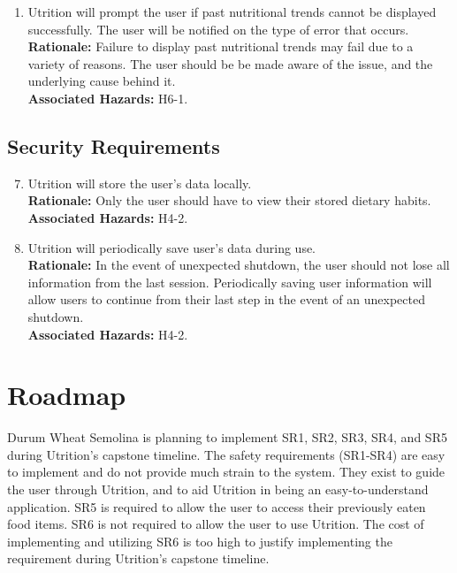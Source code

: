 \documentclass{article}
\begin{document}
\begin{enumerate}[{SR}1.]
	\item Utrition will prompt the user if past nutritional trends cannot
	be displayed successfully. The user will be notified on the type of error 
	that occurs. \\
	\textbf{Rationale:}  Failure to display past nutritional trends may fail 
	due to a variety of reasons. The user should be be made aware of the issue, 
	and the underlying cause behind it.\\	
	\textbf{Associated Hazards:} H6-1.
\end{enumerate}

\subsection{Security Requirements}
\begin{enumerate}[{SR}1.] 
	\setcounter{enumi}{6}
	
	\item Utrition will store the user’s data locally. \\
	\textbf{Rationale:} Only the user should have to view their stored dietary 
	habits. \\	
	\textbf{Associated Hazards:} H4-2.
	
	\item Utrition will periodically save user’s data during use. \\
	\textbf{Rationale:} In the event of unexpected shutdown, the user should 
	not lose all information from the last session. Periodically saving user 
	information will allow users to continue from their last step in the event 
	of an unexpected shutdown. \\	
	\textbf{Associated Hazards:} H4-2.
\end{enumerate}

\section{Roadmap}


Durum Wheat Semolina is planning to implement SR1, SR2, SR3, SR4, and SR5 during Utrition's capstone timeline. The safety requirements (SR1-SR4) are easy to implement and do not provide much strain to the system. They exist to guide the user through Utrition, and to aid Utrition in being an easy-to-understand application. SR5 is required to allow the user to access their previously eaten food items. SR6 is not required to allow the user to use Utrition. The cost of implementing and utilizing SR6 is too high to justify implementing the requirement during Utrition's capstone timeline.
	
\end{document}
